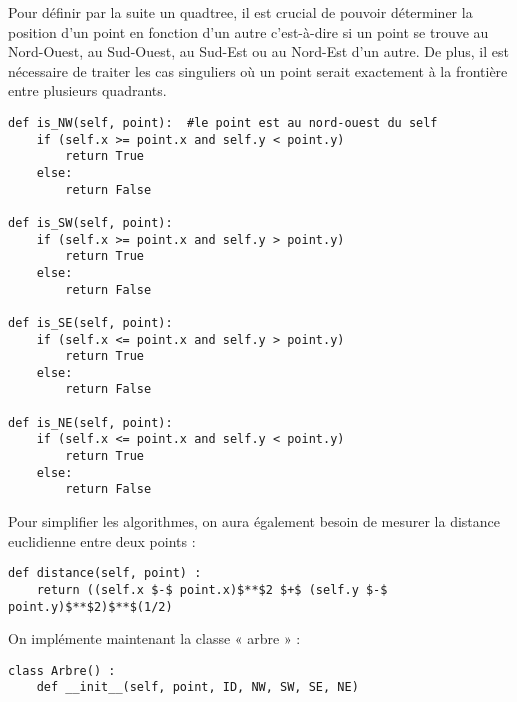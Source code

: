 \documentclass{report}
\begin{document}
Pour définir par la suite un quadtree, il est crucial de pouvoir déterminer la position d’un point en fonction d’un autre c’est-à-dire si un point se trouve au Nord-Ouest, au Sud-Ouest, au Sud-Est ou au Nord-Est d’un autre. De plus, il est nécessaire de traiter les cas singuliers où un point serait exactement à la frontière entre plusieurs quadrants.
\begin{lstlisting}
def is_NW(self, point):  #le point est au nord-ouest du self
	if (self.x >= point.x and self.y < point.y)
		return True
	else:
		return False
		
def is_SW(self, point):
	if (self.x >= point.x and self.y > point.y)
		return True
	else:
		return False
		
def is_SE(self, point):
	if (self.x <= point.x and self.y > point.y)
		return True
	else:
		return False
		
def is_NE(self, point):
	if (self.x <= point.x and self.y < point.y)
		return True
	else:
		return False
\end{lstlisting} 

Pour simplifier les algorithmes, on aura également besoin de mesurer la distance euclidienne entre deux points :
\begin{lstlisting}
def distance(self, point) :
	return ((self.x $-$ point.x)$**$2 $+$ (self.y $-$ point.y)$**$2)$**$(1/2)
\end{lstlisting}


On implémente maintenant la classe « arbre » :
\begin{lstlisting}
class Arbre() :
	def __init__(self, point, ID, NW, SW, SE, NE)
\end{lstlisting}
\end{document}
